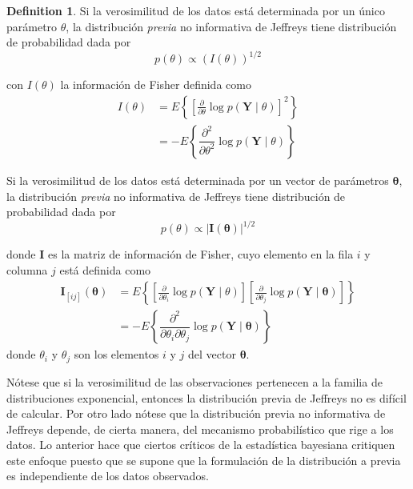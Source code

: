 \documentclass[
  spanish,
  letter]{book}
\theoremstyle{definition}
\newtheorem{definition}{Definition}[chapter]
\theoremstyle{definition}
\theoremstyle{definition}
\theoremstyle{remark}
\begin{document}
\begin{definition}
\protect\hypertarget{def:unnamed-chunk-32}{}{\label{def:unnamed-chunk-32} }Si la verosimilitud de los datos está determinada por un único parámetro \(\theta\), la distribución \emph{previa} no informativa de Jeffreys tiene distribución de probabilidad dada por
\begin{equation}
p(\theta)\propto (I(\theta))^{1/2}
\end{equation}

con \(I(\theta)\) la información de Fisher definida como
\begin{align*}
I(\theta)&=E\left\{\left[\frac{\partial}{\partial\theta}\log{p(\mathbf{Y}\mid\theta)}\right]^2\right\}\\
&=-E\left\{\dfrac{\partial^2}{\partial\theta^2}\log{p(\mathbf{Y}\mid\theta)}\right\}
\end{align*}

Si la verosimilitud de los datos está determinada por un vector de parámetros \(\boldsymbol \theta\), la distribución \emph{previa} no informativa de Jeffreys tiene distribución de probabilidad dada por
\begin{equation}
p(\theta)\propto |\mathbf{I}(\boldsymbol \theta)|^{1/2}
\end{equation}

donde \(\mathbf{I}\) es la matriz de información de Fisher, cuyo elemento en la fila \(i\) y columna \(j\) está definida como
\begin{align*}
\mathbf{I}_{[ij]}(\boldsymbol \theta)&=E\left\{\left[\frac{\partial}{\partial\theta_i}\log{p(\mathbf{Y}\mid\theta)}\right]\left[\frac{\partial}{\partial\theta_j}\log{p(\mathbf{Y}\mid\boldsymbol \theta)}\right]\right\}\\
&=-E\left\{\dfrac{\partial^2}{\partial\theta_i\partial\theta_j}\log{p(\mathbf{Y}\mid\boldsymbol \theta)}\right\}
\end{align*}
donde \(\theta_i\) y \(\theta_j\) son los elementos \(i\) y \(j\) del vector \(\boldsymbol \theta\).
\end{definition}

Nótese que si la verosimilitud de las observaciones pertenecen a la familia de distribuciones exponencial, entonces la distribución previa de Jeffreys no es difícil de calcular. Por otro lado nótese que la distribución previa no informativa de Jeffreys depende, de cierta manera, del mecanismo probabilístico que rige a los datos. Lo anterior hace que ciertos críticos de la estadística bayesiana critiquen este enfoque puesto que se supone que la formulación de la distribución a previa es independiente de los datos observados.
\end{document}
